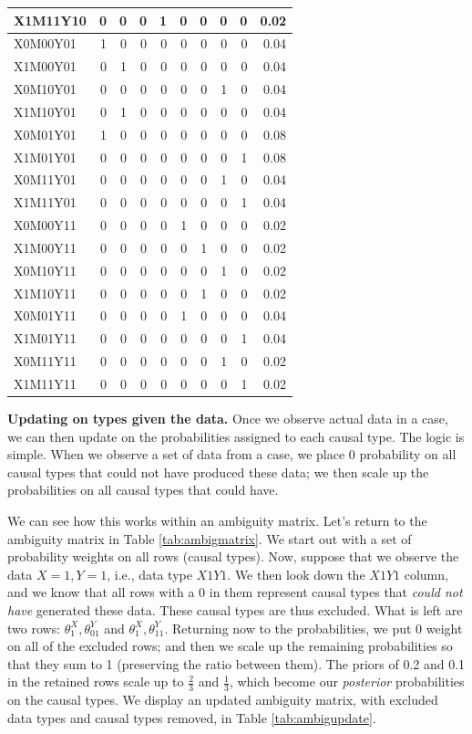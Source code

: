 \documentclass[
  12pt,
]{book}
\begin{document}
\begin{table}
\begin{tabular}[t]{l|r|r|r|r|r|r|r|r|r}
\hline
X1M11Y10 & 0 & 0 & 0 & 1 & 0 & 0 & 0 & 0 & 0.02\\
\hline
X0M00Y01 & 1 & 0 & 0 & 0 & 0 & 0 & 0 & 0 & 0.04\\
\hline
X1M00Y01 & 0 & 1 & 0 & 0 & 0 & 0 & 0 & 0 & 0.04\\
\hline
X0M10Y01 & 0 & 0 & 0 & 0 & 0 & 0 & 1 & 0 & 0.04\\
\hline
X1M10Y01 & 0 & 1 & 0 & 0 & 0 & 0 & 0 & 0 & 0.04\\
\hline
X0M01Y01 & 1 & 0 & 0 & 0 & 0 & 0 & 0 & 0 & 0.08\\
\hline
X1M01Y01 & 0 & 0 & 0 & 0 & 0 & 0 & 0 & 1 & 0.08\\
\hline
X0M11Y01 & 0 & 0 & 0 & 0 & 0 & 0 & 1 & 0 & 0.04\\
\hline
X1M11Y01 & 0 & 0 & 0 & 0 & 0 & 0 & 0 & 1 & 0.04\\
\hline
X0M00Y11 & 0 & 0 & 0 & 0 & 1 & 0 & 0 & 0 & 0.02\\
\hline
X1M00Y11 & 0 & 0 & 0 & 0 & 0 & 1 & 0 & 0 & 0.02\\
\hline
X0M10Y11 & 0 & 0 & 0 & 0 & 0 & 0 & 1 & 0 & 0.02\\
\hline
X1M10Y11 & 0 & 0 & 0 & 0 & 0 & 1 & 0 & 0 & 0.02\\
\hline
X0M01Y11 & 0 & 0 & 0 & 0 & 1 & 0 & 0 & 0 & 0.04\\
\hline
X1M01Y11 & 0 & 0 & 0 & 0 & 0 & 0 & 0 & 1 & 0.04\\
\hline
X0M11Y11 & 0 & 0 & 0 & 0 & 0 & 0 & 1 & 0 & 0.02\\
\hline
X1M11Y11 & 0 & 0 & 0 & 0 & 0 & 0 & 0 & 1 & 0.02\\
\hline
\end{tabular}
\end{table}

\textbf{Updating on types given the data.} Once we observe actual data in a case, we can then update on the probabilities assigned to each causal type. The logic is simple. When we observe a set of data from a case, we place \(0\) probability on all causal types that could not have produced these data; we then scale up the probabilities on all causal types that could have.

We can see how this works within an ambiguity matrix. Let's return to the ambiguity matrix in Table \ref{tab:ambigmatrix}. We start out with a set of probability weights on all rows (causal types). Now, suppose that we observe the data \(X=1, Y=1\), i.e., data type \(X1Y1\). We then look down the \(X1Y1\) column, and we know that all rows with a \(0\) in them represent causal types that \emph{could not have} generated these data. These causal types are thus excluded. What is left are two rows: \(\theta^X_1, \theta^Y_{01}\) and \(\theta^X_1, \theta^Y_{11}\). Returning now to the probabilities, we put 0 weight on all of the excluded rows; and then we scale up the remaining probabilities so that they sum to 1 (preserving the ratio between them). The priors of 0.2 and 0.1 in the retained rows scale up to \(\frac{2}{3}\) and \(\frac{1}{3}\), which become our \emph{posterior} probabilities on the causal types. We display an updated ambiguity matrix, with excluded data types and causal types removed, in Table \ref{tab:ambigupdate}.
\end{document}
